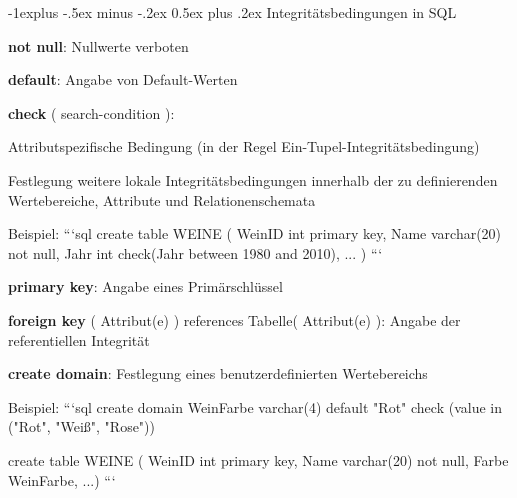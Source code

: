 \documentclass[a4paper]{article}
\makeatletter
\renewcommand{\subsection}{\@startsection{subsection}{2}{0mm}%
                                {-1explus -.5ex minus -.2ex}%
                                {0.5ex plus .2ex}%
                                {\normalfont\normalsize\bfseries}}
\makeatother
\begin{document}
\begin{multicols}{3}
\begin{itemize*}
    \subsection{Integritätsbedingungen in SQL}
    \begin{itemize*}
        \item \textbf{not null}: Nullwerte verboten
        \item \textbf{default}: Angabe von Default-Werten
        \item \textbf{check} ( search-condition ):
        \begin{itemize*}
            \item Attributspezifische Bedingung (in der Regel Ein-Tupel-Integritätsbedingung)
            \item Festlegung weitere lokale Integritätsbedingungen innerhalb der zu definierenden Wertebereiche, Attribute und Relationenschemata
            \item Beispiel:
            ```sql
            create table WEINE (
            WeinID int primary key,
            Name varchar(20) not null,
            Jahr int check(Jahr between 1980 and 2010),
            ...
            )
            ```
        \end{itemize*}
        \item \textbf{primary key}: Angabe eines Primärschlüssel
        \item \textbf{foreign key} ( Attribut(e) ) references Tabelle( Attribut(e) ): Angabe der referentiellen Integrität
        \item \textbf{create domain}: Festlegung eines benutzerdefinierten Wertebereichs
        \begin{itemize*}
            \item Beispiel:
            ```sql
            create domain WeinFarbe varchar(4)
            default "Rot"
            check (value in ("Rot", "Weiß", "Rose"))

            create table WEINE ( WeinID int primary key, Name varchar(20) not null, Farbe WeinFarbe, ...)
            ```
        \end{itemize*}
    \end{itemize*}


\end{itemize*}
\end{multicols}
\end{document}
